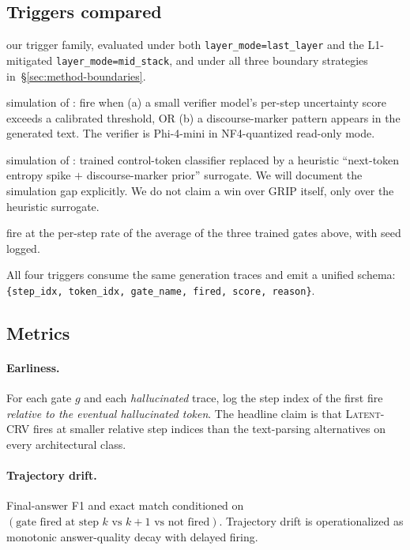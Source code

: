 \documentclass[11pt,letterpaper]{article}
\begin{document}
\subsection{Triggers compared}
\label{sec:phase4-gates}

\begin{description}[leftmargin=1.5em, itemsep=0pt]
\item[\textsc{Latent-CRV}] our trigger family, evaluated under both
\texttt{layer\_mode=last\_layer} and the L1-mitigated
\texttt{layer\_mode=mid\_stack}, and under all three boundary
strategies in~\S\ref{sec:method-boundaries}.
\item[\textsc{ReaLM-sim}] simulation of \citet{TODO:realm-retrieve}:
fire when (a) a small verifier model's per-step uncertainty score
exceeds a calibrated threshold, OR (b) a discourse-marker pattern
appears in the generated text. The verifier is Phi-4-mini in
NF4-quantized read-only mode.
\item[\textsc{GRIP-sim}] simulation of \citet{TODO:grip}: trained
control-token classifier replaced by a heuristic
``next-token entropy spike $+$ discourse-marker prior'' surrogate. We
will document the simulation gap explicitly. We do not claim a win
over GRIP itself, only over the heuristic surrogate.
\item[\textsc{Random-rate}] fire at the per-step rate of the average
of the three trained gates above, with seed logged.
\end{description}

All four triggers consume the same generation traces and emit a unified
schema: \verb|{step_idx, token_idx, gate_name, fired, score, reason}|.

\subsection{Metrics}
\label{sec:phase4-metrics}

\paragraph{Earliness.}
For each gate $g$ and each \emph{hallucinated} trace, log the step index
of the first fire \emph{relative to the eventual hallucinated token}.
The headline claim is that \textsc{Latent-CRV} fires at smaller relative
step indices than the text-parsing alternatives on every architectural
class.

\paragraph{Trajectory drift.}
Final-answer F1 and exact match conditioned on
$(\text{gate fired at step } k \text{ vs } k+1 \text{ vs not fired})$.
Trajectory drift is operationalized as monotonic answer-quality decay
with delayed firing.
\end{document}
